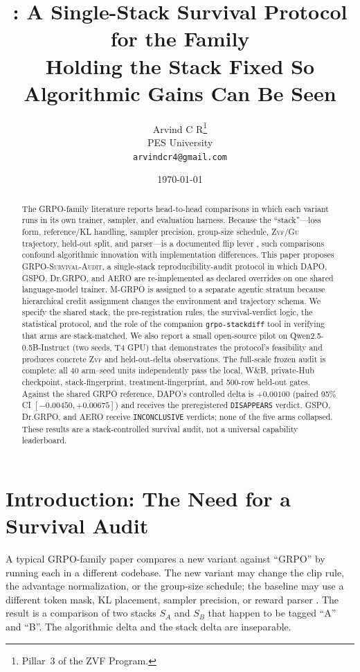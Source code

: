 \documentclass[11pt]{article}
\title{\audit{}: A Single-Stack Survival Protocol for the \grpo{} Family\\
\large Holding the Stack Fixed So Algorithmic Gains Can Be Seen}
\author{Arvind C R\thanks{Pillar~3 of the ZVF Program.}\\
PES University\\\texttt{arvindcr4@gmail.com}}
\date{\today}
\newcommand{\zvf}{\textsc{Zvf}}
\newcommand{\gu}{\textsc{Gu}}
\newcommand{\grpo}{\textsc{GRPO}}
\newcommand{\audit}{\textsc{GRPO-Survival-Audit}}
\newcommand{\AuditDAPODelta}{+0.00100}
\newcommand{\AuditDAPOCILow}{-0.00450}
\newcommand{\AuditDAPOCIHigh}{+0.00675}
\newcommand{\AuditDAPOVerdict}{DISAPPEARS}
\begin{document}
\maketitle

\begin{abstract}
The \grpo{}-family literature reports head-to-head comparisons in which each
variant runs in its own trainer, sampler, and evaluation harness. Because the
``stack''---loss form, reference/KL handling, sampler precision, group-size
schedule, \zvf/\gu{} trajectory, held-out split, and parser---is a documented
flip lever \cite{minreportrl2026}, such comparisons confound algorithmic
innovation with implementation differences. This paper proposes \audit{}, a
single-stack reproducibility-audit protocol in which DAPO, GSPO, Dr.\grpo{},
and AERO are re-implemented as declared overrides on one shared language-model
trainer. M-\grpo{} is assigned to a separate agentic stratum because
hierarchical credit assignment changes the environment and trajectory schema.
We specify the shared
stack, the pre-registration rules, the survival-verdict logic, the statistical
protocol, and the role of the companion \texttt{grpo-stackdiff} tool in
verifying that arms are stack-matched. We also report a small open-source pilot
on Qwen2.5-0.5B-Instruct (two seeds, T4 GPU) that demonstrates the protocol's
feasibility and produces concrete \zvf{} and held-out-delta observations. The
full-scale frozen audit is complete: all 40 arm--seed units independently pass
the local, W\&B, private-Hub checkpoint, stack-fingerprint,
treatment-fingerprint, and 500-row held-out gates. Against the shared GRPO
reference, DAPO's controlled delta is $\AuditDAPODelta$ (paired 95\% CI
$[\AuditDAPOCILow,\AuditDAPOCIHigh]$) and receives the preregistered
\texttt{\AuditDAPOVerdict} verdict. GSPO, Dr.\grpo{}, and AERO receive
\texttt{INCONCLUSIVE} verdicts; none of the five arms collapsed. These results
are a stack-controlled survival audit, not a universal capability leaderboard.
\end{abstract}

\section{Introduction: The Need for a Survival Audit}


A typical GRPO-family paper compares a new variant against ``GRPO'' by running
each in a different codebase. The new variant may change the clip rule, the
advantage normalization, or the group-size schedule; the baseline may use a
different token mask, KL placement, sampler precision, or reward parser
\cite{minreportrl2026, zvfaudit2026}. The result is a comparison of two stacks
$S_A$ and $S_B$ that happen to be tagged ``A'' and ``B''. The algorithmic delta
and the stack delta are inseparable.
\end{document}
